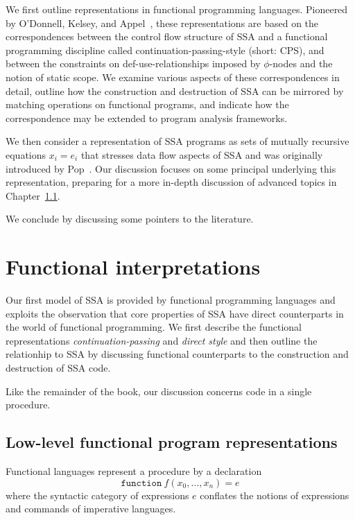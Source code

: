 We first outline representations in functional programming languages.
Pioneered by O'Donnell, Kelsey, and
Appel~\cite{ODonnellPhD,Kelsey95,Appel98:SSA}, these representations
are based on the correspondences between the control flow structure of
SSA and a functional programming discipline called
continuation-passing-style (short: CPS), and between the constraints
on def-use-relationships imposed by $\phi$-nodes and the notion of
static scope. We examine various aspects of these correspondences in
detail, outline how the construction and destruction of SSA can be
mirrored by matching operations on functional programs, and indicate
how the correspondence may be extended to program analysis frameworks.

We then consider a representation of SSA programs as sets of mutually
recursive equations $x_i = e_i$ that stresses data flow aspects of SSA
and was originally introduced by Pop~\cite{PopJS2007}.  Our discussion
focuses on some principal underlying this representation, preparing
for a more in-depth discussion of advanced topics in Chapter~\ref{}.

We conclude by discussing some pointers to the literature.

\section{Functional interpretations}
\label{section:Part1:Semantics:FunctionalLanguages}

Our first model of SSA is provided by functional programming languages
and exploits the observation that core properties of SSA have direct
counterparts in the world of functional programming.  We first
describe  the functional representations
\emph{continuation-passing} and \emph{direct style} and then outline
the relationhip to SSA by discussing functional counterparts to the
construction and destruction of SSA code.

Like the remainder of the book, our discussion concerns code in a
single procedure.

\subsection{Low-level functional program representations}

Functional languages represent a procedure by a declaration
$$\mathtt{function}\ f(x_0, \ldots, x_n) = e$$ where the syntactic
category of expressions $e$ conflates the notions of expressions and
commands of imperative languages.

